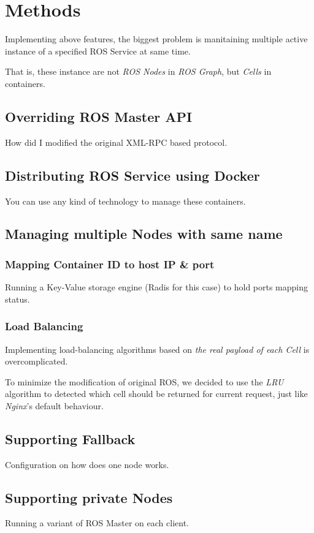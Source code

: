 \section{Methods}

Implementing above features, the biggest problem is manitaining multiple active instance of a specified ROS Service at same time.

That is, these instance are not \emph{ROS Nodes} in \emph{ROS Graph}, but \emph{Cells} in containers.

\subsection{Overriding ROS Master API}
How did I modified the original XML-RPC based protocol.

\subsection{Distributing ROS Service using Docker}
You can use any kind of technology to manage these containers.

\subsection{Managing multiple Nodes with same name}
\subsubsection{Mapping Container ID to host IP \& port}
Running a Key-Value storage engine (Radis for this case) to hold ports mapping status.

\subsubsection{Load Balancing}
Implementing load-balancing algorithms based on \emph{the real payload of each Cell} is overcomplicated.

To minimize the modification of original ROS, we decided to use the \emph{LRU} algorithm to detected which cell should be returned for current request, just like \emph{Nginx}'s default behaviour.

\subsection{Supporting Fallback}
Configuration on how does one node works. 

\subsection{Supporting private Nodes}
Running a variant of ROS Master on each client.


